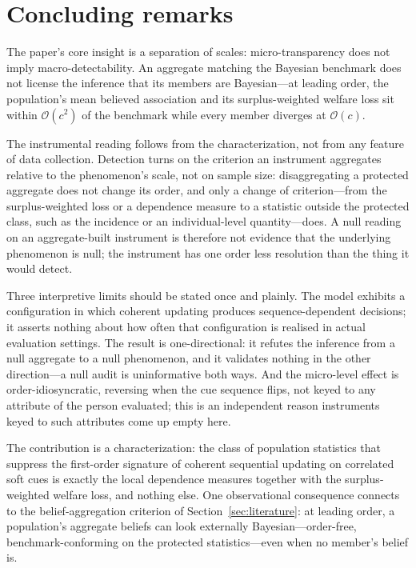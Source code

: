 \documentclass[review,12pt,authoryear]{elsarticle}
\theoremstyle{remark}
\theoremstyle{definition}
\newcommand{\bigO}{\mathcal{O}}
\begin{document}
\section{Concluding remarks}
\label{sec:conclusion}

The paper's core insight is a separation of scales: micro-transparency does not imply
macro-detectability. An aggregate matching the Bayesian benchmark does not license the inference
that its members are Bayesian---at leading order, the population's mean believed association and
its surplus-weighted welfare loss sit within $\bigO(c^{2})$ of the benchmark while every member
diverges at $\bigO(c)$.

The instrumental reading follows from the characterization, not from any feature of data
collection. Detection turns on the criterion an instrument aggregates relative to the
phenomenon's scale, not on sample size: disaggregating a protected aggregate does not change its
order, and only a change of criterion---from the surplus-weighted loss or a dependence measure
to a statistic outside the protected class, such as the incidence or an individual-level
quantity---does. A null reading on an aggregate-built instrument is therefore not evidence that
the underlying phenomenon is null; the instrument has one order less resolution than the thing
it would detect.

Three interpretive limits should be stated once and plainly. The model exhibits a configuration
in which coherent updating produces sequence-dependent decisions; it asserts nothing about how
often that configuration is realised in actual evaluation settings. The result is
one-directional: it refutes the inference from a null aggregate to a null phenomenon, and it
validates nothing in the other direction---a null audit is uninformative both ways. And the
micro-level effect is order-idiosyncratic, reversing when the cue sequence flips, not keyed to
any attribute of the person evaluated; this is an independent reason instruments keyed to
such attributes come up empty here.

The contribution is a characterization: the class of population statistics that suppress the
first-order signature of coherent sequential updating on correlated soft cues is exactly the
local dependence measures together with the surplus-weighted welfare loss, and nothing else.
One observational consequence connects to the belief-aggregation criterion of
Section~\ref{sec:literature}: at leading order, a population's aggregate beliefs can look
externally Bayesian---order-free, benchmark-conforming on the protected statistics---even when
no member's belief is.
\end{document}
